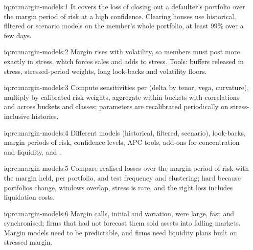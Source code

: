 \begin{solution}{iq:rc:margin-models:1}
It covers the loss of closing out a defaulter's portfolio over the margin period of risk at a high
confidence. Clearing houses use historical, filtered or scenario models on the member's whole portfolio,
at least 99\% over a few days.
\end{solution}

\begin{solution}{iq:rc:margin-models:2}
Margin rises with volatility, so members must post more exactly in stress, which forces sales and adds
to stress. Tools: buffers released in stress, stressed-period weights, long look-backs and volatility
floors.
\end{solution}

\begin{solution}{iq:rc:margin-models:3}
Compute sensitivities per  (delta by tenor, vega, curvature), multiply by calibrated risk
weights, aggregate within buckets with correlations and across buckets and classes; parameters are
recalibrated periodically on stress-inclusive histories.
\end{solution}

\begin{solution}{iq:rc:margin-models:4}
Different models (historical, filtered, scenario), look-backs, margin periods of risk, confidence levels,
APC tools, add-ons for concentration and liquidity, and .
\end{solution}

\begin{solution}{iq:rc:margin-models:5}
Compare realised losses over the margin period of risk with the margin held, per portfolio, and test
frequency and clustering; hard because portfolios change, windows overlap, stress is rare, and the
right loss includes liquidation costs.
\end{solution}

\begin{solution}{iq:rc:margin-models:6}
Margin calls, initial and variation, were large, fast and synchronised; firms that had not forecast them
sold assets into falling markets. Margin models need to be predictable, and firms need liquidity plans
built on stressed margin.
\end{solution}
